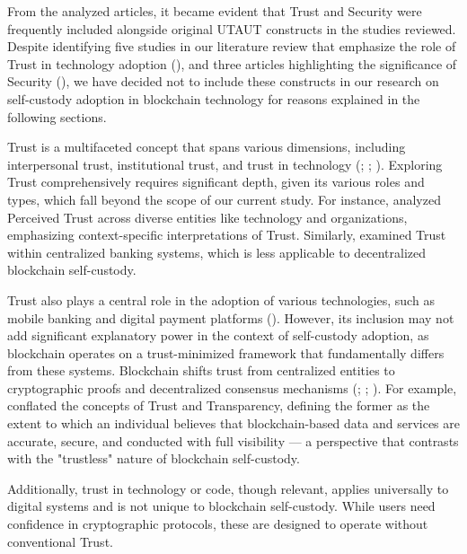 \documentclass[twocolumn]{article}
\begin{document}
From the analyzed articles, it became evident that Trust and Security were frequently included alongside original UTAUT constructs in the studies reviewed. Despite identifying five studies in our literature review that emphasize the role of Trust in technology adoption (\cite{aranyossy_konzisztens_2021, baltruschat_user_2023, kabir_application_2021, kumari_impact_2022, chang_acceptance_2022}), and three articles highlighting the significance of Security (\cite{chang_acceptance_2022, radic_you_2022, baltruschat_user_2023}), we have decided not to include these constructs in our research on self-custody adoption in blockchain technology for reasons explained in the following sections.

Trust is a multifaceted concept that spans various dimensions, including interpersonal trust, institutional trust, and trust in technology (\cite{mayer_integrative_1995}; \cite{gambetta_can_1988}; \cite{rheu_systematic_2021}). Exploring Trust comprehensively requires significant depth, given its various roles and types, which fall beyond the scope of our current study. For instance, \textcite{aranyossy_konzisztens_2021} analyzed Perceived Trust across diverse entities like technology and organizations, emphasizing context-specific interpretations of Trust. Similarly, \textcite{baltruschat_user_2023} examined Trust within centralized banking systems, which is less applicable to decentralized blockchain self-custody.

Trust also plays a central role in the adoption of various technologies, such as mobile banking and digital payment platforms (\cite{khalilzadeh_security-related_2017, alalwan_factors_2017, chandra_evaluating_2010, liu_empirical_2017}). However, its inclusion may not add significant explanatory power in the context of self-custody adoption, as blockchain operates on a trust-minimized framework that fundamentally differs from these systems. Blockchain shifts trust from centralized entities to cryptographic proofs and decentralized consensus mechanisms (\cite{nakamoto_bitcoin_2009}; \cite{auinger_blockchain_2018}; \cite{de_filippi_blockchain_2020}). For example, \textcite{chang_acceptance_2022} conflated the concepts of Trust and Transparency, defining the former as the extent to which an individual believes that blockchain-based data and services are accurate, secure, and conducted with full visibility — a perspective that contrasts with the "trustless" nature of blockchain self-custody.

Additionally, trust in technology or code, though relevant, applies universally to digital systems and is not unique to blockchain self-custody. While users need confidence in cryptographic protocols, these are designed to operate without conventional Trust.
\end{document}

